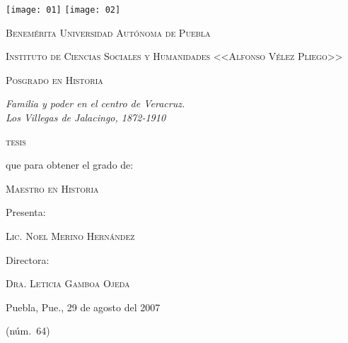 \documentclass[14pt,twoside,final]{extbook} %
\begin{document}
\setcounter{page}{1}
\parindent=5mm %
\parskip=0mm %
\newpage
\thispagestyle{empty}
\begin{center}
\begin{minipage}{11cm}
\texttt{[image: 01]}\label{fig:buap} \hfill \texttt{[image: 02]}
\label{fig:icsyh}
\end{minipage}
\end{center}
\protect\smallskip
\begin{center}
\large\scshape Benemérita Universidad Autónoma de Puebla
\end{center}
\begin{center}
\large\scshape Instituto de Ciencias Sociales y Humanidades <<Alfonso Vélez Pliego>> 
\end{center}
\begin{center}
\large\scshape Posgrado en Historia
\end{center}
\protect\bigskip
\begin{center}
\Large\itshape Familia y poder en el centro de Veracruz. \\ Los Villegas de Jalacingo, 1872-1910
\end{center}
\protect\bigskip
\begin{center}
\Large\scshape tesis
\end{center}
\protect\bigskip
\begin{center}
que para obtener el grado de:
\end{center}
\begin{center}
\scshape Maestro en Historia
\end{center}
\begin{center}
Presenta:
\end{center}
\begin{center}
\scshape Lic. Noel Merino Hernández
\end{center}
\begin{center}
Directora:
\end{center}
\begin{center}
\scshape Dra. Leticia Gamboa Ojeda
\end{center}
\protect\medskip
\begin{center}
Puebla, Pue., 29 de agosto del 2007
\end{center}
\begin{center}
(núm.\ 64)
\end{center}
\end{document}
